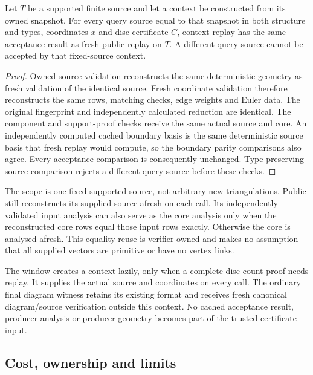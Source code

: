 \begin{proposition}
Let $T$ be a supported finite source and let a context be constructed from
its owned snapshot. For every query source equal to that snapshot in both
structure and types, coordinates $x$ and disc certificate $C$, context
replay has the same acceptance result as fresh public replay on $T$.
A different query source cannot be accepted by that fixed-source context.
\end{proposition}
\begin{proof}
Owned source validation reconstructs the same deterministic geometry as
fresh validation of the identical source. Fresh coordinate validation
therefore reconstructs the same rows, matching checks, edge weights and
Euler data. The original fingerprint and independently calculated reduction
are identical. The component and support-proof checks receive the same
actual source and core. An independently computed cached boundary basis
is the same deterministic source basis that fresh replay would compute,
so the boundary parity comparisons also agree. Every acceptance comparison
is consequently unchanged. Type-preserving source comparison rejects a
different query source before these checks.
\end{proof}

The scope is one fixed supported source, not arbitrary new triangulations.
Public  still reconstructs
its supplied source afresh on each call. Its independently validated input
analysis can also serve as the core analysis only when the reconstructed
core rows equal those input rows exactly. Otherwise the core is analysed
afresh. This equality reuse is verifier-owned and makes no assumption that
all supplied vectors are primitive or have no vertex links.

The window creates a context lazily, only when a complete disc-count proof
needs replay. It supplies the actual source and coordinates on every call.
The ordinary final diagram witness retains its existing format and receives
fresh canonical diagram/source verification outside this context. No
cached acceptance result, producer analysis or producer geometry becomes
part of the trusted certificate input.

\subsection{Cost, ownership and limits}

